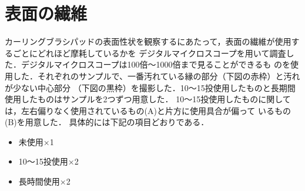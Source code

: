 \documentclass[main]{subfiles}
\begin{document}
\section{表面の繊維}

カーリングブラシパッドの表面性状を観察するにあたって，表面の繊維が使用するごとにどれほど摩耗しているかを
デジタルマイクロスコープを用いて調査した．デジタルマイクロスコープは100倍～1000倍まで見ることができるも
のを使用した．それぞれのサンプルで、一番汚れている縁の部分（下図の赤枠）と汚れが少ない中心部分
（下図の黒枠）を撮影した．10～15投使用したものと長期間使用したものはサンプルを2つずつ用意した．
10～15投使用したものに関しては，左右偏りなく使用されているもの(A)と片方に使用具合が偏って
いるもの(B)を用意した．
具体的には下記の項目どおりである．

\begin{itemize}
    \item 未使用×1
    \item 10～15投使用×2
    \item 長時間使用×2
\end{itemize}
\end{document}
